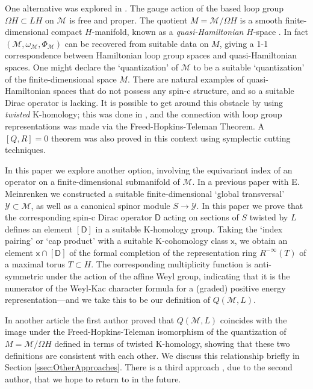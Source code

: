 \documentclass[11pt,reqno]{amsart}
\theoremstyle{definition}
\theoremstyle{remark}
\newcommand{\st}[1]{\mathsf{#1}}
\def\Y{\ensuremath{\mathcal{Y}}}
\def\M{\ensuremath{\mathcal{M}}}
\begin{document}
One alternative was explored in \cite{MeinrenkenKHomology}.  The gauge action of the based loop group $\Omega H \subset LH$ on $\M$ is free and proper.  The quotient $M=\M/\Omega H$ is a smooth finite-dimensional compact $H$-manifold, known as a \emph{quasi-Hamiltonian} $H$-space \cite{AlekseevMalkinMeinrenken}.  In fact $(\M,\omega_{\M},\Phi_{\M})$ can be recovered from suitable data on $M$, giving a 1-1 correspondence between Hamiltonian loop group spaces and quasi-Hamiltonian spaces.  One might declare the `quantization' of $\M$ to be a suitable `quantization' of the finite-dimensional space $M$.  There are natural examples of quasi-Hamiltonian spaces that do not possess any spin-c structure, and so a suitable Dirac operator is lacking.  It is possible to get around this obstacle by using \emph{twisted} K-homology; this was done in \cite{MeinrenkenKHomology}, and the connection with loop group representations was made via the Freed-Hopkins-Teleman Theorem.  A $[Q,R]=0$ theorem was also proved in this context \cite{AMWVerlinde} using symplectic cutting techniques. 

In this paper we explore another option, involving the equivariant index of an operator on a finite-dimensional submanifold of $\M$.  In a previous paper with E. Meinrenken \cite{LMSspinor} we constructed a suitable finite-dimensional `global transversal' $\Y \subset \M$, as well as a canonical spinor module $S \rightarrow \Y$.  In this paper we prove that the corresponding spin-c Dirac operator $\st{D}$ acting on sections of $S$ twisted by $L$ defines an element $[\st{D}]$ in a suitable K-homology group.  Taking the `index pairing' or `cap product' with a suitable K-cohomology class $\st{x}$, we obtain an element $\st{x} \cap [\st{D}]$ of the formal completion of the representation ring $R^{-\infty}(T)$ of a maximal torus $T \subset H$.  The corresponding multiplicity function is anti-symmetric under the action of the affine Weyl group, indicating that it is the numerator of the Weyl-Kac character formula for a (graded) positive energy representation---and we take this to be our definition of $Q(\M,L)$.

In another article \cite{LoizidesGeomKHom} the first author proved that $Q(\M,L)$ coincides with the image under the Freed-Hopkins-Teleman isomorphism of the quantization of $M=\M/\Omega H$ defined in terms of twisted K-homology, showing that these two definitions are consistent with each other.  We discuss this relationship briefly in Section \ref{ssec:OtherApproaches}.  There is a third approach \cite{SongDiracLoopGroup}, due to the second author, that we hope to return to in the future.
\end{document}
